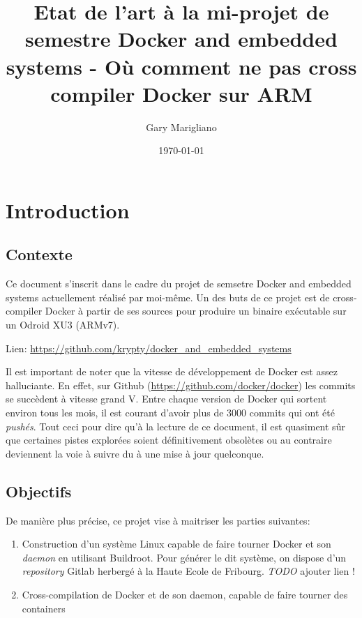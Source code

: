 \documentclass[11pt,a4paper]{article}
\title{Etat de l'art à la mi-projet de semestre Docker and embedded systems - Où comment ne pas cross compiler Docker sur ARM}
\date{\today}
\author{Gary Marigliano}
\begin{document}
\maketitle
{}
\newpage
\tableofcontents
\newpage
{}

\section{Introduction}

\subsection{Contexte}

Ce document s'inscrit dans le cadre du projet de semsetre Docker and embedded systems actuellement réalisé par moi-même. Un des buts de ce projet est de cross-compiler Docker à partir de ses sources pour produire un binaire exécutable sur un Odroid XU3 (ARMv7).

Lien: \url{https://github.com/krypty/docker_and_embedded_systems}

Il est important de noter que la vitesse de développement de Docker est assez halluciante. En effet, sur Github (\url{https://github.com/docker/docker}) les commits se succèdent à vitesse grand V. Entre chaque version de Docker qui sortent environ tous les mois, il est courant d'avoir plus de 3000 commits qui ont été \emph{pushés}. Tout ceci pour dire qu'à la lecture de ce document, il est quasiment sûr que certaines pistes explorées soient définitivement obsolètes ou au contraire deviennent la voie à suivre du à une mise à jour quelconque.




\subsection{Objectifs}

De manière plus précise, ce projet vise à maitriser les parties suivantes:

\begin{enumerate}
  \item Construction d'un système Linux capable de faire tourner Docker et son \emph{daemon} en utilisant Buildroot. Pour générer le dit système, on dispose d'un \emph{repository} Gitlab herbergé à la Haute Ecole de Fribourg. \emph{TODO} ajouter lien !

  \item Cross-compilation de Docker et de son daemon, capable de faire tourner des containers
\end{enumerate}
\end{document}
